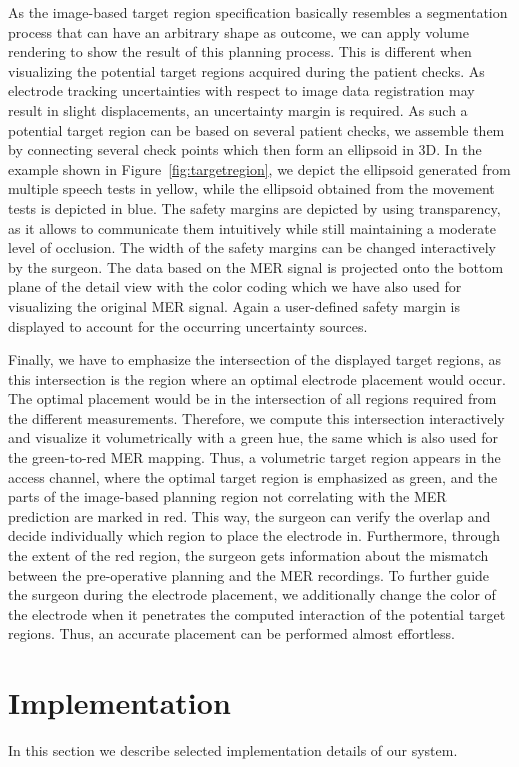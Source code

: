 \documentclass{vgtc}                          %
\begin{document}
As the image-based target region specification basically resembles a segmentation process that can have an arbitrary shape as outcome, we can apply volume rendering to show the result of this planning process. This is different when visualizing the potential target regions acquired during the patient checks. As electrode tracking uncertainties with respect to image data registration may result in slight displacements, an uncertainty margin is required. As such a potential target region can be based on several patient checks, we assemble them by connecting several check points which then form an ellipsoid in 3D. In the example shown in Figure~\ref{fig:targetregion}, we depict the ellipsoid generated from multiple speech tests in yellow, while the ellipsoid obtained from the movement tests is depicted in blue. The safety margins are depicted by using transparency, as it allows to communicate them intuitively while still maintaining a moderate level of occlusion. The width of the safety margins can be changed interactively by the surgeon. The data based on the MER signal is projected onto the bottom plane of the detail view with the color coding which we have also used for visualizing the original MER signal. Again a user-defined safety margin is displayed to account for the occurring uncertainty sources.

Finally, we have to emphasize the intersection of the displayed target regions, as this intersection is the region where an optimal electrode placement would occur. The optimal placement would be in the intersection of all regions required from the different measurements. Therefore, we compute this intersection interactively and visualize it volumetrically with a green hue, the same which is also used for the green-to-red MER mapping. Thus, a volumetric target region appears in the access channel, where the optimal target region is emphasized as green, and the parts of the image-based planning region not correlating with the MER prediction are marked in red. This way, the surgeon can verify the overlap and decide individually which region to place the electrode in. Furthermore, through the extent of the red region, the surgeon gets information about the mismatch between the pre-operative planning and the MER recordings. To further guide the surgeon during the electrode placement, we additionally change the color of the electrode when it penetrates the computed interaction of the potential target regions. Thus, an accurate placement can be performed almost effortless.

\section{Implementation}\label{sec:implementation}
In this section we describe selected implementation details of our system.
\end{document}

